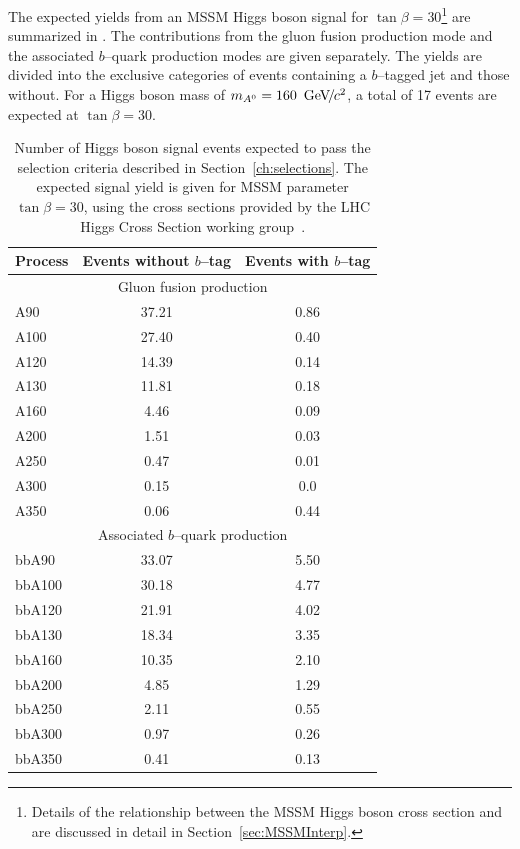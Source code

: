The expected yields from an MSSM Higgs boson signal for \mbox{$\tan\beta =
30$}\footnote{Details of the relationship between the MSSM Higgs boson cross section
and \tb are discussed in detail in Section~\ref{sec:MSSMInterp}.}
are summarized in \label{tab:SignalExpResultsLooseAHtoMuTau}.  The contributions
from the gluon fusion production mode and the associated $b$--quark production
modes are given separately.  The yields are divided into the exclusive
categories of events containing a \mbox{$b$--tagged} jet and those without.  For a
Higgs boson mass of $m_{A^0} = 160~{\,\text{Ge\hspace{-.08em}V\hspace{-0.16em}/\hspace{-0.08em}}c^\text{2}}$, a total of 17 events are expected at
$\tan\beta = 30$.
%
\begin{table}[t]
\begin{center}
\begin{tabular}{|l|c|c|}
\hline
Process & Events without $b$--tag & Events with $b$--tag \\
\hline
\hline
\multicolumn{3}{|c|}{Gluon fusion production} \\
\hline
A90 & 37.21 & 0.86 \\
A100 & 27.40 & 0.40 \\
A120 & 14.39 & 0.14 \\
A130 & 11.81 & 0.18 \\
A160 & 4.46 & 0.09 \\
A200 & 1.51 & 0.03 \\
A250 & 0.47 & 0.01 \\
A300 & 0.15 & 0.0 \\
A350 & 0.06 & 0.44 \\
\hline
\multicolumn{3}{|c|}{Associated $b$--quark production} \\
\hline
bbA90 & 33.07 &  5.50 \\
bbA100 & 30.18 &  4.77 \\
bbA120 & 21.91 & 4.02 \\
bbA130 & 18.34 & 3.35 \\ 
bbA160 & 10.35 &  2.10 \\
bbA200 & 4.85  &  1.29 \\
bbA250 & 2.11 &  0.55 \\
bbA300 & 0.97 &  0.26 \\
bbA350 & 0.41 & 0.13 \\
\hline
\end{tabular}
\caption[Expected signal yields at \mbox{$\tan \beta = 30$}]{Number of Higgs
boson signal events expected to pass the selection criteria described in
Section~\ref{ch:selections}.  The expected signal yield is given for MSSM
parameter \mbox{$\tan \beta = 30$}, using the cross sections provided by the LHC
Higgs Cross Section working group~\cite{LHC-HCWG}.} \label{tab:SignalExpResultsLooseAHtoMuTau}
\end{center}
\end{table}

